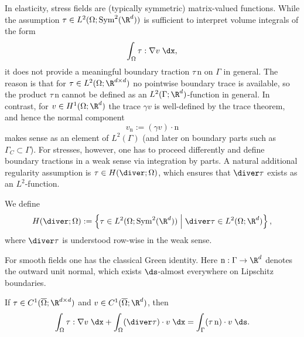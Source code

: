 In elasticity, stress fields are (typically symmetric) matrix-valued functions. While the assumption $\tau\in L^2(\Omega;\mathrm{Sym}^2(\R^d))$ is sufficient to interpret volume integrals of the form
\begin{equation*}
	\int_\Omega \tau:\nabla v\;\dx,
\end{equation*}
it does not provide a meaningful boundary traction $\tau\,\mathrm n$ on $\Gamma$ in general. The reason is that for $\tau\in L^2(\Omega;\R^{d\times d})$ no pointwise boundary trace is available, so the product $\tau\,\mathrm n$ cannot be defined as an $L^2(\Gamma;\R^d)$-function in general. In contrast, for $v\in H^1(\Omega;\R^d)$ the trace $\gamma v$ is well-defined by the trace theorem, and hence the normal component
\begin{equation*}
	v_{\mathrm n}:=(\gamma v)\cdot \mathrm n
\end{equation*}
makes sense as an element of $L^2(\Gamma)$ (and later on boundary parts such as $\Gamma_C\subset\Gamma$). For stresses, however, one has to proceed differently and define boundary tractions in a weak sense via integration by parts. A natural additional regularity assumption is $\tau\in H(\diver;\Omega)$, which ensures that $\diver\tau$ exists as an $L^2$-function.

\begin{definition}\label{def:Hdiv}
	We define
	\begin{equation*}
		H(\diver;\Omega)
		:=
		\left\{\tau\in L^2(\Omega;\mathrm{Sym}^2(\R^d))\;\middle|\;\diver\tau\in L^2(\Omega;\R^d)\right\},
	\end{equation*}
	where $\diver\tau$ is understood row-wise in the weak sense.
\end{definition}

For smooth fields one has the classical Green identity. Here $\mathrm n:\Gamma\to\R^d$ denotes the outward unit normal, which exists $\ds$-almost everywhere on Lipschitz boundaries.

\begin{proposition}\label{pr:green_smooth}
	If $\tau\in C^1(\overline{\Omega};\R^{d\times d})$ and $v\in C^1(\overline{\Omega};\R^d)$, then
	\begin{equation}\label{eq:green_smooth}
		\int_\Omega \tau:\nabla v\;\dx + \int_\Omega (\diver\tau)\cdot v\;\dx
		= \int_\Gamma (\tau\,\mathrm{n})\cdot v\;\ds.
	\end{equation}
\end{proposition}

